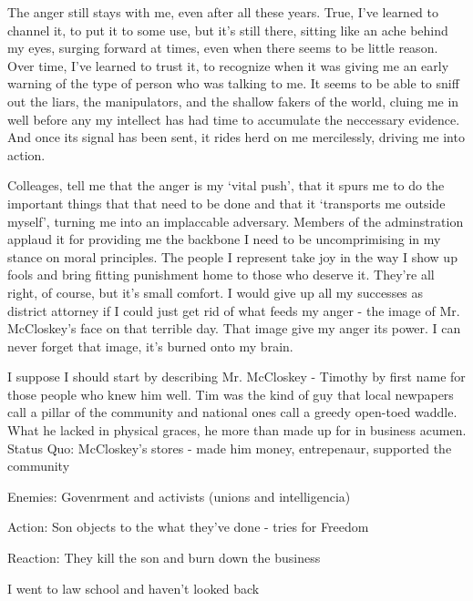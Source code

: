 The anger still stays with me, even after all these years.  True, I've learned to channel it, 
to put it to some use, but it's still there, sitting like an ache behind my eyes, surging forward at 
times, even when there seems to be little reason.  Over time, I've learned to trust it, to
recognize when it was giving me an early warning of the type of person who was talking to me.
It seems to be able to sniff out the liars, the manipulators, and the shallow fakers of the world, cluing me in
well before any my intellect has had time to accumulate the neccessary evidence. And once its signal has been sent, 
it rides herd on me mercilessly, driving me into action.

Colleages, tell me that the anger is my `vital push', that it spurs me to do the important
things that that need to be done and that it `transports me outside myself', turning me 
into an implaccable adversary.  Members of the adminstration applaud it for providing me the
backbone I need to be uncomprimising in my stance on moral principles.  The people I represent take joy in 
the way I show up fools and bring fitting punishment home to those who deserve it.  They're all right, of course, 
but it's small comfort.  I would give up all my successes as district attorney if I could just get rid of what feeds 
my anger - the image of Mr. McCloskey's face on that terrible day.  That image give my anger its power.  
I can never forget that image, it's burned onto my brain.


I suppose I should start by describing Mr. McCloskey - Timothy by first name for those people
who knew him well. Tim was the kind of guy that local newpapers call a pillar of the community 
and national ones call a greedy  
open-toed waddle.  What he lacked in physical graces, he more than made up for in business acumen.
Status Quo:  McCloskey's stores - made him money, entrepenaur, supported the community

Enemies:  Govenrment and activists (unions and intelligencia)


Action:  Son objects to the what they've done - tries for Freedom

Reaction:  They kill the son and burn down the business

I went to law school and haven't looked back